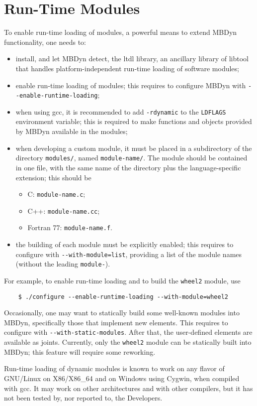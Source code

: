 \documentclass[10pt,dvips]{report}
\newcommand{\kw}[1]{\texttt{#1}}
\begin{document}
\section{Run-Time Modules}
To enable run-time loading of modules, a powerful means to extend
MBDyn functionality, one needs to:
\begin{itemize}
\item install, and let MBDyn detect, the ltdl library, an ancillary
library of libtool that handles platform-independent run-time loading
of software modules;
\item enable run-time loading of modules; this requires to configure
MBDyn with \kw{{-}{-}enable-runtime-loading};
\item when using gcc, it is recommended to add \kw{-rdynamic} to
the \kw{LDFLAGS} environment variable; this is required to make
functions and objects provided by MBDyn available in the modules;
\item when developing a custom module, it must be placed in a subdirectory
of the directory \kw{modules/}, named \kw{module-name/}.
The module should be contained in one file, with the same name
of the directory plus the language-specific extension; this should be
	\begin{itemize}
	\item C: \kw{module-name.c};
	\item C++: \kw{module-name.cc};
	\item Fortran 77: \kw{module-name.f}.
\end{itemize}
\item the building of each module must be explicitly enabled; 
this requires to configure with \kw{{-}{-}with-module=list}, 
providing a list of the module names (without the leading \kw{module-}).
\end{itemize}
For example, to enable run-time loading and to build the \kw{wheel2} module,
use
\begin{verbatim}
    $ ./configure --enable-runtime-loading --with-module=wheel2
\end{verbatim}
Occasionally, one may want to statically build some well-known modules
into MBDyn, specifically those that implement new elements.
This requires to configure with \kw{{-}{-}with-static-modules}.
After that, the user-defined elements are available as joints.
Currently, only the \kw{wheel2} module can be statically built
into MBDyn; this feature will require some reworking.

Run-time loading of dynamic modules is known to work on any flavor
of GNU/Linux on X86/X86\_64 and on Windows using Cygwin, when compiled 
with gcc.
It may work on other architectures and with other compilers, but it has
not been tested by, nor reported to, the Developers.
\end{document}
